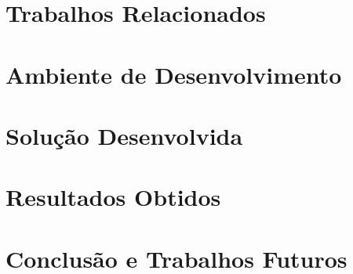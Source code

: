 \documentclass[portuguese,oneside]{tcc}
\begin{document}
\chapter{Trabalhos Relacionados}
\label{cha:trab}


\chapter{Ambiente de Desenvolvimento}
\label{cha:componentes}


\chapter{Solução Desenvolvida}
\label{cha:implementacao}


\chapter{Resultados Obtidos}
\label{cha:resultados}


% 

\chapter{Conclusão e Trabalhos Futuros}
\label{cha:conclusao}


%



\end{document}
